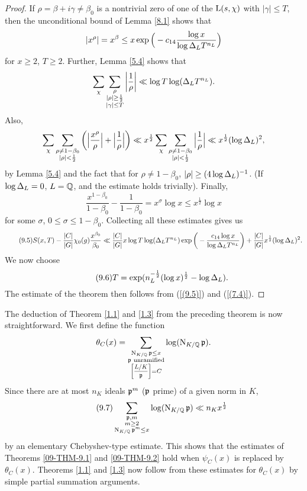 \documentclass[./main]{subfiles}
\begin{document}
\begin{proof}
If $\rho = \beta + i \gamma \neq \beta_0$ is a nontrivial zero of one of the $\operatorname{L}(s, \chi)$ with $|\gamma| \leq T$, then the unconditional bound of Lemma \ref{8.1} shows that 
\[
|x^\rho| = x^\beta \leq x \exp\Big(-c_{14} \frac{\log x}{\log \Delta_L  T^{n_L}}\Big)
\]
for $x\geq 2$, $T \geq 2$.
Further, Lemma \ref{5.4} shows that
\[
\sum_\chi \sum_{\substack{\rho \\ |\rho| \geq \frac{1}{2} \\ |\gamma| \leq T}} \bigg| \frac{1}{\rho} \bigg| \ll \log T \log (\Delta_L  T^{n_L}).
\]
Also,
\[
\sum_\chi \sum_{\substack{\rho \neq 1 - \beta_0 \\ |\rho| < \frac{1}{2}}} \bigg( \Big|\frac{x^\rho}{\rho}\Big| + \Big|\frac{1}{\rho}\Big|\bigg) \ll x^{\frac{1}{2}} \sum_\chi \sum_{\substack{\rho \neq 1 - \beta_0 \\ |\rho| < \frac{1}{2}}} \Big| \frac{1}{\rho}\Big| \ll x^\frac{1}{2} (\log \Delta_L )^2,
\]
by Lemma \ref{5.4} and the fact that for $\rho \neq 1 - \beta_0$, $|\rho| \geq (4\log \Delta_L )^{-1}$.
(If $\log \Delta_L  = 0$, $L=\mathbb{Q}$, and the estimate holds trivially).
Finally,
\[
\frac{x^{1 - \beta_0}}{1 - \beta_0}  - \frac{1}{1 - \beta_0} = x^\sigma \log x \leq x^{\frac{1}{2}} \log x
\]
for some $\sigma$, $0 \leq \sigma \leq 1 - \beta_0$.
Collecting all these estimates gives us
\[\tag{9.5}\label{(9.5)}
    S(x, T) - \frac{|C|}{|G|} \chi_0(g) \frac{x^{\beta_0}}{\beta_0} 
     \ll \frac{|C|}{|G|} x \log T \log (\Delta_L  T^{n_L}) \exp\bigg(- \frac{c_{14}\log x}{\log \Delta_L T^{n_L}}\bigg) + \frac{|C|}{|G|} x^{\frac{1}{2}} (\log \Delta_L )^2.
\]
We now choose 
\[\tag{9.6}\label{(9.6))}
T = \exp(n_{L}^{-\frac{1}{2}} (\log x)^{\frac{1}{2}} - \log \Delta_L ).
\]
The estimate of the theorem then follows from (\ref{(9.5)}) and (\ref{(7.4)}).
\end{proof}

The deduction of Theorem \ref{1.1} and \ref{1.3} from the preceding theorem is now straightforward.
We first define the function
\[
\theta_C(x) = \sum_{\substack{\norm_{K/\Q}  \p \leq x \\ \p\text{ unramified} \\ \Scale[0.75]{\ArtinSymbol{L/K}{\p}} = C }} \log(\norm_{K/\Q}\p).
\]
Since there are at most $n_K$ ideals $\mathfrak{p}^m$ ($\mathfrak{p}$ prime) of a given norm in $K$,
\[\tag{9.7}\label{(9.7)}
\sum_{\substack{\mathfrak{p}, m \\ m\ge 2 \\ \operatorname{N}_{K/\mathbb{Q}} \mathfrak{p}^m \le x}} \log(\operatorname{N}_{K/\mathbb{Q}}\mathfrak{p}) \ll n_K x^{\frac{1}{2}}
\]
by an elementary Chebyshev-type estimate.
This shows that the estimates of Theorems \ref{09-THM-9.1} and \ref{09-THM-9.2} hold when $\psi_C(x)$ is replaced by $\theta_C(x)$.
Theorems \ref{1.1} and \ref{1.3} now follow from these estimates for $\theta_C(x)$ by simple partial summation arguments.
\end{document}

